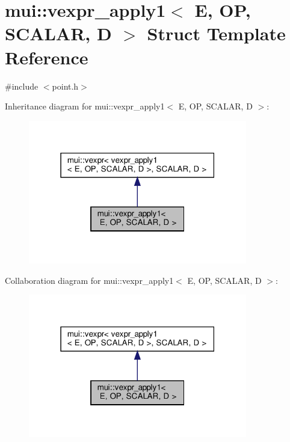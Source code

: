 \hypertarget{structmui_1_1vexpr__apply1}{}\section{mui\+:\+:vexpr\+\_\+apply1$<$ E, OP, S\+C\+A\+L\+AR, D $>$ Struct Template Reference}
\label{structmui_1_1vexpr__apply1}


{\ttfamily \#include $<$point.\+h$>$}



Inheritance diagram for mui\+:\+:vexpr\+\_\+apply1$<$ E, OP, S\+C\+A\+L\+AR, D $>$\+:
\nopagebreak
\begin{figure}[H]
\begin{center}
\leavevmode
\includegraphics[width=271pt]{structmui_1_1vexpr__apply1__inherit__graph}
\end{center}
\end{figure}


Collaboration diagram for mui\+:\+:vexpr\+\_\+apply1$<$ E, OP, S\+C\+A\+L\+AR, D $>$\+:
\nopagebreak
\begin{figure}[H]
\begin{center}
\leavevmode
\includegraphics[width=271pt]{structmui_1_1vexpr__apply1__coll__graph}
\end{center}
\end{figure}
